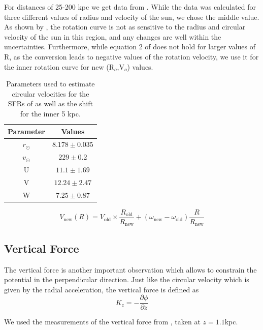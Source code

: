 \documentclass[fleqn,usenatbib]{mnras}
\begin{document}
For distances of 25-200 kpc we get data from \citet{2014ApJ...785...63B}. While the data was calculated for three different values of radius and velocity of the sun, we chose the middle value. As shown by \citet{2014ApJ...785...63B}, the rotation curve is not as sensitive to the radius and circular velocity of the sun in this region, and any changes are well within the uncertainties. Furthermore, while equation 2 of \citet{2014ApJ...785...63B} does not hold for larger values of R, as the conversion leads to negative values of the rotation velocity, we use it for the inner rotation curve for new (R$_o$,V$_o$) values.
\begin{table}
    \centering
    \begin{tabular}{|c|c|}
        \hline
        Parameter&Values\\
        \hline
        \hline
        $r_\odot$ & $8.178\pm 0.035$ \\
        $v_\odot$ & $229 \pm 0.2$ \\
        U & $11.1 \pm 1.69$ \\
        V & $12.24 \pm 2.47$ \\
        W & $7.25 \pm 0.87$ \\
        \hline
    \end{tabular}
    \caption{Parameters used to estimate circular velocities for the SFRs of \citet{2019ApJ...885..131R} as well as the shift for the inner 5 kpc.}
    \label{tab:params}
\end{table}

\begin{equation}
    V_\text{new}(R)=V_\text{old}\times\frac{R_{\text{old}}}{R_{\text{new}}} + (\omega_\text{new}-\omega_\text{old})\frac{R}{R_\text{new}}
\end{equation}



\subsection{Vertical Force}

The vertical force is another important observation which allows to constrain the potential in the perpendicular direction. Just like the circular velocity which is given by the radial acceleration, the vertical force is defined as
\begin{equation}
        K_{z}=-\frac{\partial\phi}{\partial z}
\end{equation}

We used the measurements of the vertical force from \citet{2013ApJ...779..115B}, taken at $z = 1.1 $kpc.
\end{document}
